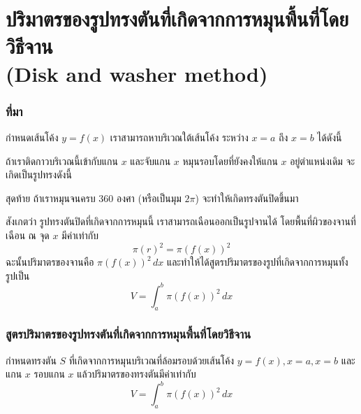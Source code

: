 \section[หมุนพื้นที่โดยวิธีจาน]{ปริมาตรของรูปทรงตันที่เกิดจากการหมุนพื้นที่โดยวิธีจาน \\ (Disk and washer method)}
\frame{\sectionpage}

\begin{frame}
\frametitle{ที่มา}
กำหนดเส้นโค้ง $y=f(x)$ เราสามารถหาบริเวณใต้เส้นโค้ง ระหว่าง $x=a$ ถึง $x=b$ ได้ดังนี้
\end{frame}

\begin{frame}
ถ้าเราติดกาวบริเวณนี้เข้ากับแกน $x$ และจับแกน $x$ หมุนรอบโดยที่ยังคงให้แกน $x$ อยู่ตำแหน่งเดิม จะเกิดเป็นรูปทรงดังนี้
\end{frame}

\begin{frame}
สุดท้าย ถ้าเราหมุนจนครบ 360 องศา (หรือเป็นมุม $2\pi$) จะทำให้เกิดทรงตันปิดขึ้นมา
\end{frame}

\begin{frame}
สังเกตว่า รูปทรงตันปิดที่เกิดจากการหมุนนี้ เราสามารถเฉือนออกเป็นรูปจานได้ โดยพื้นที่ผิวของจานที่เฉือน ณ จุด $x$ มีค่าเท่ากับ
\[ \pi (r)^2 = \pi (f(x))^2\]
ฉะนั้นปริมาตรของจานคือ $\pi (f(x))^2 \, dx$ และทำให้ได้สูตรปริมาตรของรูปที่เกิดจากการหมุนทั้งรูปเป็น
\[V = \int_a^b \pi (f(x))^2 \, dx \]
\end{frame}

\begin{frame}
\frametitle{สูตรปริมาตรของรูปทรงตันที่เกิดจากการหมุนพื้นที่โดยวิธีจาน}
\begin{thm}{}{}
กำหนดทรงตัน $S$ ที่เกิดจากการหมุนบริเวณที่ล้อมรอบด้วยเส้นโค้ง $y = f(x), x = a, x = b$ และแกน $x$ รอบแกน $x$ แล้วปริมาตรของทรงตันมีค่าเท่ากับ
\begin{equation} \label{eq:int_applied_volume_disk_x}
V = \int_a^b \pi (f(x))^2 \, dx 
\end{equation}
\end{thm}
\end{frame}




